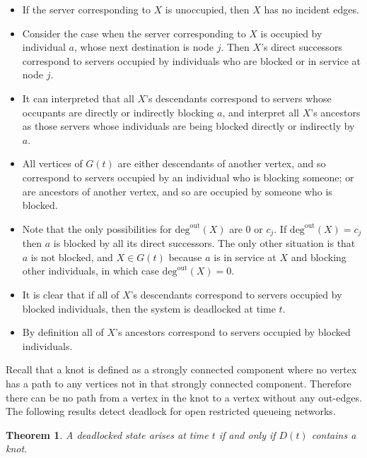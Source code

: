 \documentclass{article}
\newtheorem{theorem}{Theorem}
\numberwithin{equation}{section}
\begin{document}
\begin{itemize}

  \item If the server corresponding to $X$ is unoccupied, then $X$ has no
  incident edges.
  \item Consider the case when the server corresponding to $X$ is occupied by
  individual $a$, whose next destination is node $j$.
  Then $X$'s direct successors correspond to servers occupied by individuals
  who are blocked or in service at node $j$.
  \item It can interpreted that all $X$'s descendants correspond to servers
  whose occupants are directly or indirectly blocking $a$, and interpret all
  $X$'s ancestors as those servers whose individuals are being blocked
  directly or indirectly by $a$.
  \item All vertices of $G(t)$ are either descendants of another vertex, and
  so correspond to servers occupied by an individual who is blocking someone;
  or are ancestors of another vertex, and so are occupied by someone who is
  blocked.
  \item Note that the only possibilities for $\text{deg}^{\text{out}}(X)$ are
  0 or $c_j$. If $\text{deg}^{\text{out}}(X) = c_j$ then $a$ is blocked by all
  its direct successors. The only other situation is that $a$ is not blocked,
  and $X \in G(t)$ because $a$ is in service at $X$ and blocking other
  individuals, in which case $\text{deg}^{\text{out}}(X) = 0$.
  \item It is clear that if all of $X$'s descendants correspond to servers
  occupied by blocked individuals, then the system is deadlocked at time $t$.
  \item By definition all of $X$'s ancestors correspond to servers occupied by
  blocked individuals.

\end{itemize}

Recall that a knot is defined as a strongly connected component where no
vertex has a path to any vertices not in that strongly connected component.
Therefore there can be no path from a vertex in the knot to a vertex without
any out-edges.
The following results detect deadlock for open restricted queueing networks.


\begin{theorem}\label{thrm:knot}
A deadlocked state arises at time $t$ if and only if $D(t)$ contains a knot.
\end{theorem}
\end{document}
